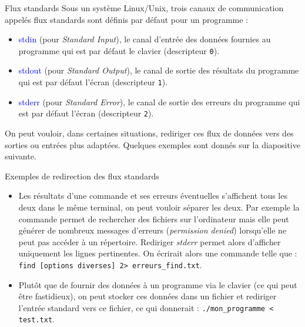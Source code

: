 \documentclass[10pt]{beamer}
\begin{document}
\begin{frame}{\Ctitle}{\stitle}
	\begin{block}{Flux standards}
		Sous un système Linux/Unix, trois canaux de communication appelés flux standards sont définis par défaut pour un programme :
		\begin{itemize}
			\item<2-> \textcolor{blue}{stdin} (pour \textit{Standard Input}), le canal d'entrée des données fournies au programme qui est par défaut le clavier (descripteur {\tt 0}).
			\item<3-> \textcolor{blue}{stdout} (pour \textit{Standard Output}), le canal de sortie des résultats du programme qui est par défaut l'écran (descripteur {\tt 1}).
			\item<4-> \textcolor{blue}{stderr} (pour \textit{Standard Error}), le canal de sortie des erreurs du programme qui est par défaut l'écran (descripteur {\tt 2}).
		\end{itemize}
	 On peut vouloir, dans certaines situations, rediriger ces flux de données vers des sorties ou entrées plus adaptées. Quelques exemples sont donnés sur la diapositive suivante.
	\end{block}
\end{frame}

\begin{frame}{\Ctitle}{\stitle}
	\begin{exampleblock}{Exemples de redirection des flux standards}
		\begin{itemize}
		\item<2-> Les résultats d'une commande et ses erreurs éventuelles s'affichent tous les deux dans le même terminal, on peut vouloir séparer les deux. Par exemple la commande  permet de rechercher des fichiers sur l'ordinateur mais elle peut générer de nombreux messages d'erreurs (\textit{permission denied}) lorsqu'elle ne peut pas accéder à un répertoire. Rediriger \textit{stderr} permet alors d'afficher uniquement les lignes pertinentes. On écrirait alors une commande telle que : {\tt find [options diverses] 2> erreurs\_find.txt}. 
		\item<3-> Plutôt que de fournir des données à un programme via le clavier (ce qui peut être fastidieux), on peut stocker ces données dans un fichier et rediriger l'entrée standard vers ce fichier, ce qui donnerait : {\tt ./mon\_programme < test.txt}.
		\end{itemize}
	\end{exampleblock}
\end{frame}
\end{document}
